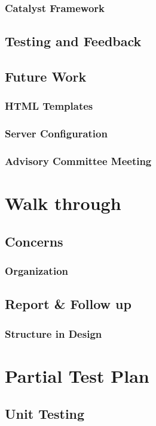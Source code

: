 \documentclass[11pt,a4paper]{report}
\begin{document}
\subsection{Catalyst Framework}

\section{Testing and Feedback}

\section{Future Work}
\subsection{HTML Templates}
\subsection{Server Configuration}
\subsection{Advisory Committee Meeting}
\chapter{Walk through}
\section{Concerns}
\subsection{Organization}

\section{Report \& Follow up}
\subsection{Structure in Design}

\chapter{Partial Test Plan}
\section{Unit Testing}
\end{document}
